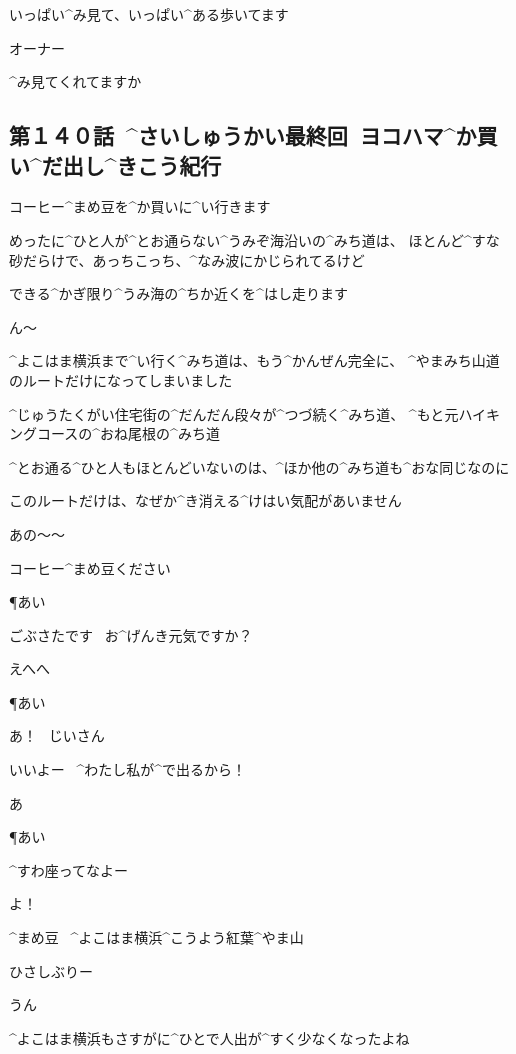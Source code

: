 \A いっぱい^{み}{見}て、いっぱい^{ある}{歩}いてます

\page
\A オーナー

\A ^{み}{見}てくれてますか


\subsection{第１４０話\ ^{さいしゅうかい}{最終回}\ ヨコハマ^{か}{買}い^{だ}{出}し^{きこう}{紀行}}

\page[140]
\A コーヒー^{まめ}{豆}を^{か}{買}いに^{い}{行}きます

\A めったに^{ひと}{人}が^{とお}{通}らない^{うみぞ}{海沿}いの^{みち}{道}は、
ほとんど^{すな}{砂}だらけで、あっちこっち、^{なみ}{波}にかじられてるけど

\A できる^{かぎ}{限}り^{うみ}{海}の^{ちか}{近}くを^{はし}{走}ります

\page
\A ん〜

\page
\A ^{よこはま}{横浜}まで^{い}{行}く^{みち}{道}は、もう^{かんぜん}{完全}に、
^{やまみち}{山道}のルートだけになってしまいました

\A ^{じゅうたくがい}{住宅街}の^{だんだん}{段々}が^{つづ}{続}く^{みち}{道}、
^{もと}{元}ハイキングコースの^{おね}{尾根}の^{みち}{道}

\page
\A ^{とお}{通}る^{ひと}{人}もほとんどいないのは、^{ほか}{他}の^{みち}{道}も^{おな}{同}じなのに

\A このルートだけは、なぜか^{き}{消}える^{けはい}{気配}があいません

\page[145]
\A あの〜〜

\A コーヒー^{まめ}{豆}ください

\P あい

\A ごぶさたです
\ お^{げんき}{元気}ですか？

\A えへへ

\P あい

\R あ！
\ じいさん

\R いいよー
\ ^{わたし}{私}が^{で}{出}るから！

\A あ

\P あい

\R ^{すわ}{座}ってなよー

\page
\R よ！

\Sign ^{まめ}{豆}
\ ^{よこはま}{横浜}^{こうよう}{紅葉}^{やま}{山}

\R ひさしぶりー

\A うん

\A ^{よこはま}{横浜}もさすがに^{ひとで}{人出}が^{すく}{少}なくなったよね

